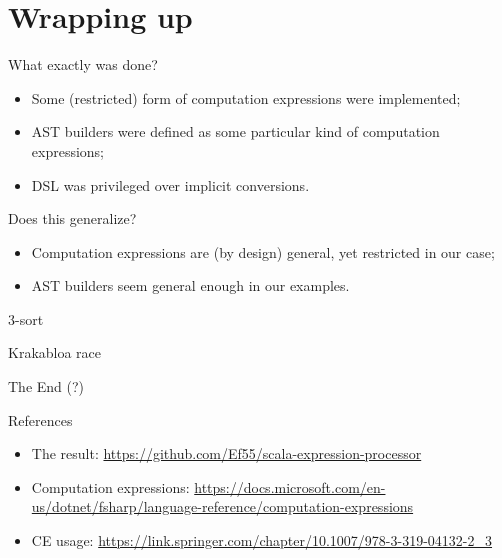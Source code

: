 \documentclass{beamer}
\begin{document}
    \section{Wrapping up}

    \begin{frame}{What exactly was done?}
        \begin{itemize}
            \item Some (restricted) form of computation expressions were implemented;
            \item AST builders were defined as some particular kind of computation expressions;
            \item DSL was privileged over implicit conversions.
        \end{itemize}
    \end{frame}

    \begin{frame}{Does this generalize?}
        \begin{itemize}
            \item Computation expressions are (by design) general, yet restricted in our case;
            \item AST builders seem general enough in our examples.
        \end{itemize}
    \end{frame}

    \appendix

    \begin{frame}{3-sort}
        
    \end{frame}

    \begin{frame}{Krakabloa race}
        
    \end{frame}

    \begin{frame}[standout]
        The End (?)
    \end{frame}

    \begin{frame}{References}
        \begin{itemize}
            \item The result: \url{https://github.com/Ef55/scala-expression-processor}
            \item Computation expressions: \url{https://docs.microsoft.com/en-us/dotnet/fsharp/language-reference/computation-expressions}
            \item CE usage: \url{https://link.springer.com/chapter/10.1007/978-3-319-04132-2_3}
        \end{itemize}
    \end{frame}
\end{document}
